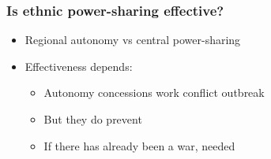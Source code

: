 \documentclass[aspectratio=43]{beamer}
\begin{document}







\begin{frame}
\frametitle{Is ethnic power-sharing effective?}
\centering

\begin{itemize}[<+->]
  \item Regional autonomy vs central power-sharing
  \item Effectiveness depends:
  \begin{itemize}
    \item Autonomy concessions work {\color{red}{before}} conflict outbreak
    \item But they do {\color{red}{not}} prevent {\color{red}{recurrence}}
    \item If there has already been a war, {\color{red}{central power-sharing}} needed
  \end{itemize}
\end{itemize}

\end{frame}
\end{document}
